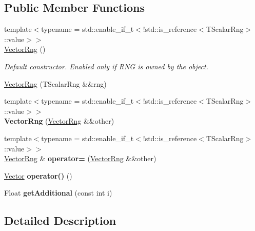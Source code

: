 \subsection*{Public Member Functions}
\begin{DoxyCompactItemize}
\item 
\hypertarget{classVectorRng_a1267f4fa0d0e1839155fff3246b88f21}{}\label{classVectorRng_a1267f4fa0d0e1839155fff3246b88f21} 
{\footnotesize template$<$typename  = std\+::enable\+\_\+if\+\_\+t$<$!std\+::is\+\_\+reference$<$\+T\+Scalar\+Rng$>$\+::value$>$$>$ }\\\hyperlink{classVectorRng_a1267f4fa0d0e1839155fff3246b88f21}{Vector\+Rng} ()
\begin{DoxyCompactList}\small\item\em Default constructor. Enabled only if R\+NG is owned by the object. \end{DoxyCompactList}\item 
\hyperlink{classVectorRng_af12715177fe686a88c27cedec337cd4b}{Vector\+Rng} (T\+Scalar\+Rng \&\&rng)
\item 
\hypertarget{classVectorRng_aa90fbbcb5b786f4790968f11413b4326}{}\label{classVectorRng_aa90fbbcb5b786f4790968f11413b4326} 
{\footnotesize template$<$typename  = std\+::enable\+\_\+if\+\_\+t$<$!std\+::is\+\_\+reference$<$\+T\+Scalar\+Rng$>$\+::value$>$$>$ }\\{\bfseries Vector\+Rng} (\hyperlink{classVectorRng}{Vector\+Rng} \&\&other)
\item 
\hypertarget{classVectorRng_aa717e68f3025971330580b8ab66d2b4a}{}\label{classVectorRng_aa717e68f3025971330580b8ab66d2b4a} 
{\footnotesize template$<$typename  = std\+::enable\+\_\+if\+\_\+t$<$!std\+::is\+\_\+reference$<$\+T\+Scalar\+Rng$>$\+::value$>$$>$ }\\\hyperlink{classVectorRng}{Vector\+Rng} \& {\bfseries operator=} (\hyperlink{classVectorRng}{Vector\+Rng} \&\&other)
\item 
\hypertarget{classVectorRng_aa8605d4cd296d79028a551c8417d726b}{}\label{classVectorRng_aa8605d4cd296d79028a551c8417d726b} 
\hyperlink{classBasicVector}{Vector} {\bfseries operator()} ()
\item 
\hypertarget{classVectorRng_a8a0ee1faddb538935d2f843203130041}{}\label{classVectorRng_a8a0ee1faddb538935d2f843203130041} 
Float {\bfseries get\+Additional} (const int i)
\end{DoxyCompactItemize}


\subsection{Detailed Description}
